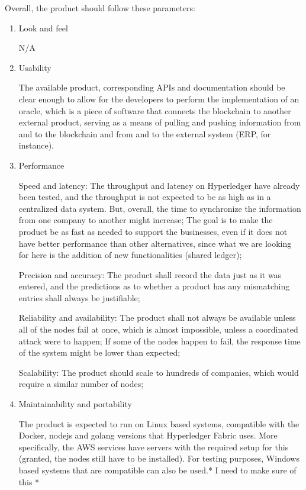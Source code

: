 Overall, the product should follow these parameters:
\begin{enumerate}
	\item Look and feel 
		\par N/A 
    \item  Usability
		\par The available product, corresponding APIs  and documentation should be clear enough to allow for the developers to perform the implementation of an oracle, which is a piece of software that connects the blockchain to another external product, serving as a means of pulling and pushing information from and to the blockchain and from and to the external system (ERP, for instance).
    \item  Performance
		\par Speed and latency: The throughput and latency on Hyperledger have already been tested, and the throughput is not expected to be as high as in a centralized data system. But, overall, the time to synchronize the information from one company to another might increase; The goal is to make the product be as fast as needed to support the businesses, even if it does not have better performance than other alternatives, since what we are looking for here is the addition of new functionalities (shared ledger);
		\par Precision and accuracy: The product shall record the data just as it was entered, and the predictions as to whether a product has any mismatching entries shall always be justifiable;
		\par Reliability and availability: The product shall not always be available unless all of the nodes fail at once, which is almost impossible, unless a coordinated attack were to happen; If some of the nodes happen to fail, the response time of the system might be lower than expected;
		\par Scalability: The product should scale to hundreds of companies, which would require a similar number of nodes;
    \item  Maintainability and portability
		\par The product is expected to run on Linux based systems, compatible with the Docker, nodejs and golang versions that Hyperledger Fabric uses. More specifically, the AWS services have servers with the required setup for this (granted, the nodes still have to be installed). For testing purposes, Windows based systems that are compatible can also be used.* I need to make sure of this *

\end{enumerate}

